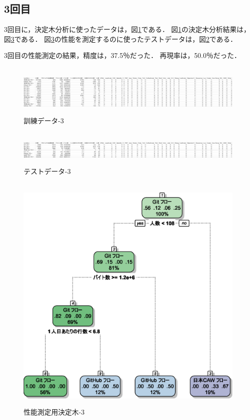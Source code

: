 \subsection{3回目}
3回目に，決定木分析に使ったデータは，図\ref{データ3-1}である．
図\ref{データ3-1}の決定木分析結果は，図\ref{決定木3}である．
図\ref{決定木3}の性能を測定するのに使ったテストデータは，図\ref{データ3-2}である．


3回目の性能測定の結果，精度は，37.5％だった．
再現率は，50.0％だった．


\begin{figure}[H]
\centering　
\includegraphics[width=13cm]{3-1.png}
\caption{訓練データ-3}\label{データ3-1}
\end{figure}
\begin{figure}[H]
\centering　
\includegraphics[width=13cm]{3-2.png}
\caption{テストデータ-3}\label{データ3-2}
\end{figure}
\begin{figure}[H]
\centering　
\includegraphics[width=13cm]{3.eps}
\caption{性能測定用決定木-3}\label{決定木3}
\end{figure}


